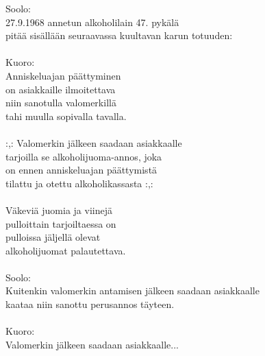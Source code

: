 
            Soolo: \\
            27.9.1968 annetun alkoholilain 47. pykälä \\
            pitää sisällään seuraavassa kuultavan karun totuuden: \\
\hspace{10mm} \\
            Kuoro: \\
            Anniskeluajan päättyminen \\
            on asiakkaille ilmoitettava \\
            niin sanotulla valomerkillä \\
            tahi muulla sopivalla tavalla. \\
\hspace{10mm} \\
            :,: Valomerkin jälkeen saadaan asiakkaalle \\
            tarjoilla se alkoholijuoma-annos, joka \\
            on ennen anniskeluajan päättymistä \\
            tilattu ja otettu alkoholikassasta :,: \\
\hspace{10mm} \\
            Väkeviä juomia ja viinejä \\
            pulloittain tarjoiltaessa on \\
            pulloissa jäljellä olevat \\
            alkoholijuomat palautettava. \\
\hspace{10mm} \\
            Soolo: \\
            Kuitenkin valomerkin antamisen jälkeen saadaan asiakkaalle \\
            kaataa niin sanottu perusannos täyteen. \\
\hspace{10mm} \\
            Kuoro: \\
            Valomerkin jälkeen saadaan asiakkaalle... \\

